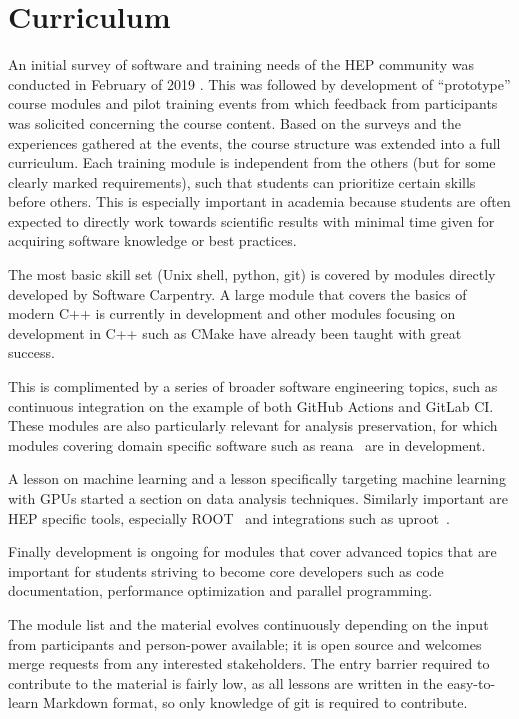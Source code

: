 \documentclass[twocolumn]{svjour3}          %
\begin{document}
\section{Curriculum}\label{sec:Curriculum}

An initial survey of software and training needs of the HEP community was conducted in February of 2019 \cite{david_lange}. This was followed by development of ``prototype'' course modules and  pilot training events from which feedback from participants was solicited concerning the course content.
Based on the surveys and the experiences gathered at the events, the course structure was extended into a full curriculum.
Each training module is independent from the others (but for some clearly marked requirements), such that students can prioritize certain skills before others. This is especially important in academia because students are often expected to directly work towards scientific results with minimal time given for acquiring software knowledge or best practices.

The most basic skill set (Unix shell, python, git) is covered by modules directly developed by Software Carpentry. A large module that covers the basics of modern C++ is currently in development and other modules focusing on development in C++ such as CMake have already been taught with great success.

This is complimented by a series of broader software engineering topics, such as continuous integration on the example of both GitHub Actions and GitLab CI. These modules are also particularly relevant for analysis preservation, for which modules covering domain specific software such as reana~\cite{reana} are in development.

A lesson on machine learning and a lesson specifically targeting machine learning with GPUs started a section on data analysis techniques. Similarly important are HEP specific tools, especially ROOT~\cite{root_cern} and integrations such as uproot~\cite{uproot}.

Finally development is ongoing for modules that cover advanced topics that are important for students striving to become core developers such as code documentation, performance optimization and parallel programming.

The module list and the material evolves continuously depending on the input from participants and person-power available; it is open source and welcomes merge requests from any interested stakeholders. 
The entry barrier required to contribute to the material is fairly low, as all lessons are written in the easy-to-learn Markdown format, so only knowledge of git is required to contribute.
\end{document}
